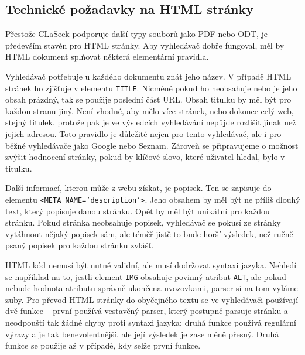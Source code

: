 \documentclass{article}
\newcommand{\name}{CLaSeek}
\newcommand{\code}[1]{\texttt{#1}}
\newcommand{\ssection}[1]{\subsection{#1}}
\DeclareMathOperator{\tfidf}{tf-idf}
\begin{document}


\ssection{Technické požadavky na HTML stránky}
Přestože \name{} podporuje další typy souborů jako PDF nebo ODT, je především stavěn pro HTML stránky. Aby vyhledávač dobře fungoval, měl by HTML dokument splňovat některá elementární pravidla. 

Vyhledávač potřebuje u každého dokumentu znát jeho název. V případě HTML stránek ho zjišťuje v elementu \code{TITLE}. Nicméně pokud ho neobsahuje nebo je jeho obsah prázdný, tak se použije poslední část URL. Obsah titulku by měl být pro každou stranu jiný. Není vhodné, aby mělo více stránek, nebo dokonce celý web, stejný titulek, protože pak je ve výsledcích vyhledávání nepůjde rozlišit jinak než jejich adresou. Toto pravidlo je důležité nejen pro tento vyhledávač, ale i pro běžné vyhledávače jako Google nebo Seznam. Zároveň se připravujeme o možnost zvýšit hodnocení stránky, pokud by klíčové slovo, které uživatel hledal, bylo v titulku. 

Další informací, kterou může z webu získat, je popisek. Ten se zapisuje do elementu \code{<META NAME='description'>}. Jeho obsahem by měl být ne příliš dlouhý text, který popisuje danou stránku. Opět by měl být unikátní pro každou stránku. Pokud stránka neobsahuje popisek, vyhledávač se pokusí ze stránky vytáhnout nějaký popisek sám, ale téměř jistě to bude horší výsledek, než ručně psaný popisek pro každou stránku zvlášť. 

HTML kód nemusí být nutně validní, ale musí dodržovat syntaxi jazyka. Nehledí se například na to, jestli element \code{IMG} obsahuje povinný atribut \code{ALT}, ale pokud nebude hodnota atributu správně ukončena uvozovkami, parser si na tom vyláme zuby. Pro převod HTML stránky do obyčejného textu se ve vyhledávači používají dvě funkce -- první používá vestavěný parser, který postupně parsuje stránku a neodpouští tak žádné chyby proti syntaxi jazyka; druhá funkce používá regulární výrazy a je tak benevolentnější, ale její výsledek je zase méně přesný. Druhá funkce se použije až v případě, kdy selže první funkce.
\end{document}
